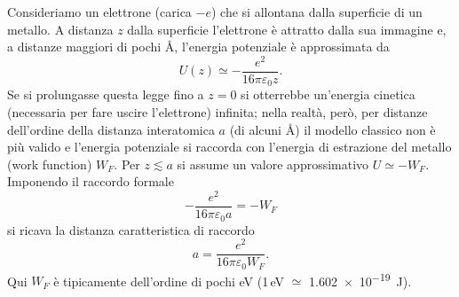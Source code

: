 \documentclass{book}
\begin{document}
Consideriamo un elettrone (carica $-e$) che si allontana dalla superficie di un metallo. A distanza $z$ dalla superficie l'elettrone è attratto dalla sua immagine e, a distanze maggiori di pochi \AA, l'energia potenziale è approssimata da
\[
U(z)\simeq -\frac{e^{2}}{16\pi\varepsilon_0 z}.
\]
Se si prolungasse questa legge fino a $z=0$ si otterrebbe un'energia cinetica (necessaria per fare uscire l'elettrone) infinita; nella realtà, però, per distanze dell'ordine della distanza interatomica $a$ (di alcuni \AA) il modello classico non è più valido e l'energia potenziale si raccorda con l'energia di estrazione del metallo (work function) $W_F$. Per $z\lesssim a$ si assume un valore approssimativo $U\simeq -W_F$. Imponendo il raccordo formale
\[
-\frac{e^{2}}{16\pi\varepsilon_0 a} = -W_F
\]
si ricava la distanza caratteristica di raccordo
\[
a = \frac{e^{2}}{16\pi\varepsilon_0 W_F}.
\]
Qui $W_F$ è tipicamente dell'ordine di pochi eV (1\,eV \(\simeq\) \SI{1.602e-19}{J}).
\end{document}
